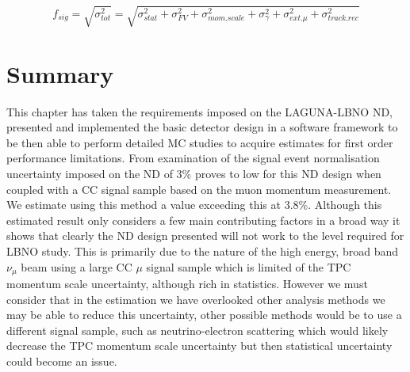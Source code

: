 \begin{equation}
	f_{sig} = \sqrt{\sigma_{tot}^{2}} = \sqrt{ \sigma_{stat}^{2} + \sigma_{FV}^{2} +\sigma_{mom. scale}^{2} + \sigma_{\gamma}^{2} + \sigma_{ext. \mu}^{2} + \sigma_{track.rec}^{2}}
	\label{eq:signalEventNormalisation}
\end{equation}



\section{Summary}
This chapter has taken the requirements imposed on the LAGUNA-LBNO ND, presented and implemented the basic detector design in a software framework to be then able to perform detailed MC studies to acquire estimates for first order performance limitations. From examination of the signal event normalisation uncertainty imposed on the ND of 3\% proves to low for this ND design when coupled with a CC signal sample based on the muon momentum measurement. We estimate using this method a value exceeding this at 3.8\%. Although this estimated result only considers a few main contributing factors in a broad way it shows that clearly the ND design presented will not work to the level required for LBNO study. This is primarily due to the nature of the high energy, broad band $\nu_{\mu}$ beam using a large CC $\mu$ signal sample which is limited of the TPC momentum scale uncertainty, although rich in statistics. However we must consider that in the estimation we have overlooked other analysis methods we may be able to reduce this uncertainty, other possible methods would be to use a different signal sample, such as neutrino-electron scattering which would likely decrease the TPC momentum scale uncertainty but then statistical uncertainty could become an issue.

